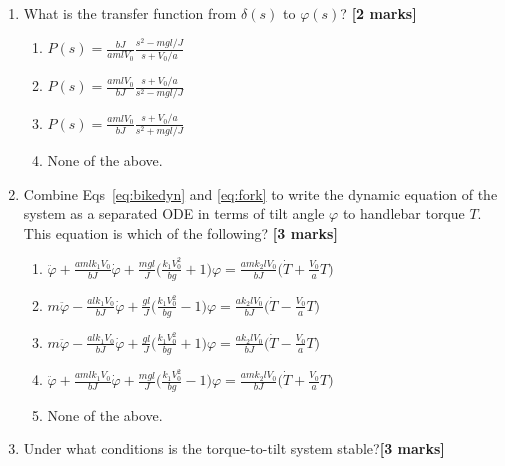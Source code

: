 \documentclass{article}
\begin{document}
\begin{enumerate}[resume]
    \item What is the transfer function from $\delta(s)$ to $\varphi(s)$? \textbf{[2 marks]}


    \begin{enumerate}
        \item {$\displaystyle P(s) = \frac{bJ}{amlV_0}\frac{s^2-mgl/J}{s+V_0/a} $}
        \item \textbf{{$\displaystyle P(s) = \frac{amlV_0}{bJ}\frac{s+V_0/a}{s^2-mgl/J} $}}
        \item {$\displaystyle P(s) = \frac{amlV_0}{bJ}\frac{s+V_0/a}{s^2+mgl/J} $}
        \item {None of the above.} 
    \end{enumerate}

    \item Combine Eqs~\eqref{eq:bikedyn} and \eqref{eq:fork} to write the dynamic equation of the system as a separated ODE in terms of tilt angle $\varphi$ to handlebar torque $T$. This equation is which of the following? \textbf{[3 marks]}

    \begin{enumerate}
        \item $\displaystyle 
          \ddot\varphi + \frac{amlk_1V_0}{bJ}\dot\varphi + \frac{mgl}{J}\biggl(\frac{k_1V_0^2}{bg}+1\biggr)\varphi= \frac{amk_2lV_0}{bJ}\biggl(\dot T + \frac{V_0}{a}T\biggr)
          $
        
        \item $\displaystyle 
          m\ddot\varphi - \frac{alk_1V_0}{bJ}\dot\varphi + \frac{gl}{J}\biggl(\frac{k_1V_0^2}{bg}-1\biggr)\varphi= \frac{ak_2lV_0}{bJ}\biggl(\dot T - \frac{V_0}{a}T\biggr)
          $
        
        \item $\displaystyle 
          m\ddot\varphi - \frac{alk_1V_0}{bJ}\dot\varphi + \frac{gl}{J}\biggl(\frac{k_1V_0^2}{bg}+1\biggr)\varphi= \frac{ak_2lV_0}{bJ}\biggl(\dot T - \frac{V_0}{a}T\biggr)
          $
            
        \item \textbf{$\displaystyle 
          \ddot\varphi + \frac{amlk_1V_0}{bJ}\dot\varphi + \frac{mgl}{J}\biggl(\frac{k_1V_0^2}{bg}-1\biggr)\varphi= \frac{amk_2lV_0}{bJ}\biggl(\dot T + \frac{V_0}{a}T\biggr)
          $}
        \item{None of the above.}
    \end{enumerate}

    \item Under what conditions is the torque-to-tilt system stable?\textbf{[3 marks]}
    

\end{enumerate}
\end{document}
